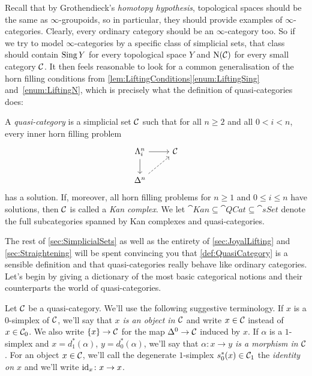 Recall that by Grothendieck's \emph{homotopy hypothesis}, topological spaces should be the same as $\infty$-groupoids, so in particular, they should provide examples of $\infty$-categories. Clearly, every ordinary category should be an $\infty$-category too. So if we try to model $\infty$-categories by a specific class of simplicial sets, that class should contain $\operatorname{Sing} Y$ for every topological space $Y$ and $\operatorname{N}(\mathcal{C})$ for every small category $\mathcal{C}$. It then feels reasonable to look for a common generalisation of the horn filling conditions from \cref{lem:LiftingConditions}\cref{enum:LiftingSing} and~\cref{enum:LiftingN}, which is precisely what the definition of quasi-categories does:
\begin{defi}\label{def:QuasiCategory}
	A \emph{quasi-category} is a simplicial set $\mathcal{C}$ such that for all $n\geqslant 2$ and all $0<i<n$, every inner horn filling problem
	\begin{equation*}
		\begin{tikzcd}
			\Lambda_i^n\rar\dar & \Cc\\
			\Delta^n\urar[dashed]
		\end{tikzcd}
	\end{equation*}
	has a solution. If, moreover, all horn filling problems for $n\geqslant 1$ and $0\leqslant i\leqslant n$ have solutions, then $\mathcal{C}$ is called a \emph{Kan complex}. We let $\cat{Kan}\subseteq\cat{QCat}\subseteq\cat{sSet}$ denote the full subcategories spanned by Kan complexes and quasi-categories.
\end{defi}
The rest of \cref{sec:SimplicialSets} as well as the entirety of \cref{sec:JoyalLifting} and \cref{sec:Straightening} will be spent convincing you that \cref{def:QuasiCategory} is a sensible definition and that quasi-categories really behave like ordinary categories. Let's begin by giving a dictionary of the most basic categorical notions and their counterparts the world of quasi-categories.
\begin{numpar}
	Let $\mathcal{C}$ be a quasi-category. We'll use the following suggestive terminology. If $x$ is a $0$-simplex of $\mathcal{C}$, we'll say that \emph{$x$ is an object in $\mathcal{C}$} and write $x\in\mathcal{C}$ instead of $x\in\mathcal{C}_0$. We also write $\{x\}\rightarrow \mathcal{C}$ for the map $\Delta^0\rightarrow \mathcal{C}$ induced by $x$. If $\alpha$ is a $1$-simplex and $x=d_1^*(\alpha)$, $y=d_0^*(\alpha)$, we'll say that \emph{$\alpha\colon x\rightarrow y$ is a morphism in $\mathcal{C}$}. For an object $x\in\mathcal{C}$, we'll call the degenerate $1$-simplex $s_0^*(x)\in\mathcal{C}_1$ the \emph{identity on $x$} and we'll write $\operatorname{id}_x\colon x\rightarrow x$.
\end{numpar}
